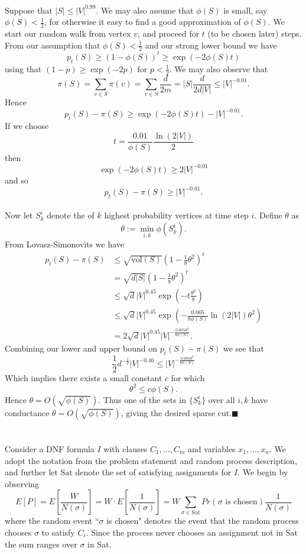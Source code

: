 \documentclass[letterpaper,12pt,oneside,onecolumn]{article}
\begin{document}
	\paragraph{}
	Suppose that $|S| \leq |V|^{0.99}$. We may also assume that $\phi(S)$ is small, say $\phi(S) < \frac{1}{2}$, for otherwise it easy to find a good approximation of $\phi(S)$. We start our random walk from vertex $v$, and proceed for $t$ (to be chosen later) steps. From our assumption that $\phi(S)<\frac{1}{2}$ and our strong lower bound we have
	$$p_t(S) \geq (1-\phi(S))^t \geq \exp(-2\phi(S)t)$$
	using that $(1-p)\geq \exp(-2p)$ for $p<\frac{1}{2}$.
	We may also observe that
	$$\pi(S) = \sum_{v\in S} \pi(v) = \sum_{v\in S} \frac{d}{2m} = |S|\frac{d}{2d|V|}\leq |V|^{-0.01}.$$
	Hence
	$$p_t(S) - \pi(S) \geq \exp(-2\phi(S)t) - |V|^{-0.01}.$$
	If we choose 
	$$t = \frac{0.01}{\phi(S)}\frac{\ln(2|V|)}{2}$$	
	then
	$$\exp(-2\phi(S)t) \geq 2|V|^{-0.01}$$
	and so
	$$p_t(S) - \pi(S) \geq |V|^{-0.01}.$$
	\paragraph{}
	Now let $S_k^i$ denote the of $k$ highest probability vertices at time step $i$. Define $\theta$ as
	$$\theta:= \min_{i,k}\phi(S_k^i).$$
	From Lovasz-Simonovits we have
	\begin{align*}
	p_t(S) - \pi(S) &\leq \sqrt{\text{vol}(S)}(1-\frac{1}{8}\theta^2)^t\\
	&= \sqrt{d|S|}(1-\frac{1}{8}\theta^2)^t\\
	&\leq \sqrt{d}|V|^{0.45}\exp(-t\frac{\theta^2}{8})\\
	&\leq \sqrt{d}|V|^{0.45}\exp(-\frac{0.005}{8\phi(S)}\ln(2|V|)\theta^2)\\
	&=2\sqrt{d}|V|^{0.45}|V|^{-\frac{0.005\theta^2}{8\phi(S)}}.
	\end{align*}
	Combining our lower and upper bound on $p_t(S)-\pi(S)$ we see that
	$$\frac{1}{2}d^{-\frac{1}{2}}|V|^{-0.46} \leq |V|^{-\frac{0.005\theta^2}{8\phi(S)}}$$
	Which implies there exists a small constant $c$ for which
	$$\theta^2 \leq c\phi(S).$$
	Hence $\theta = O(\sqrt{\phi(S)}).$ Thus one of the sets in $\{S^i_k\}$ over all $i,k$ have conductance $\theta=O(\sqrt{\phi(S)})$, giving the desired sparse cut.$\blacksquare$
	\newpage
	\section{}
	\paragraph{}
	Consider a DNF formula $I$ with clauses $C_1, \dots, C_m$ and variables $x_1, \dots, x_n$. We adopt the notation from the problem statement and random process description, and further let $\text{Sat}$ denote the set of satisfying assignments for $I$. We begin by observing
	$$E[P] = E[\frac{W}{N(\sigma)}] = W\cdot E[\frac{1}{N(\sigma)}] = W\sum_{\sigma \in \text{Sat}} Pr(\sigma \text{ is chosen})\frac{1}{N(\sigma)}$$
	where the random event ``$\sigma$ is chosen" denotes the event that the random process chooses $\sigma$ to satisfy $C_i$. Since the process never chooses an assignment not in $\text{Sat}$ the sum ranges over $\sigma$ in Sat.
\end{document}
